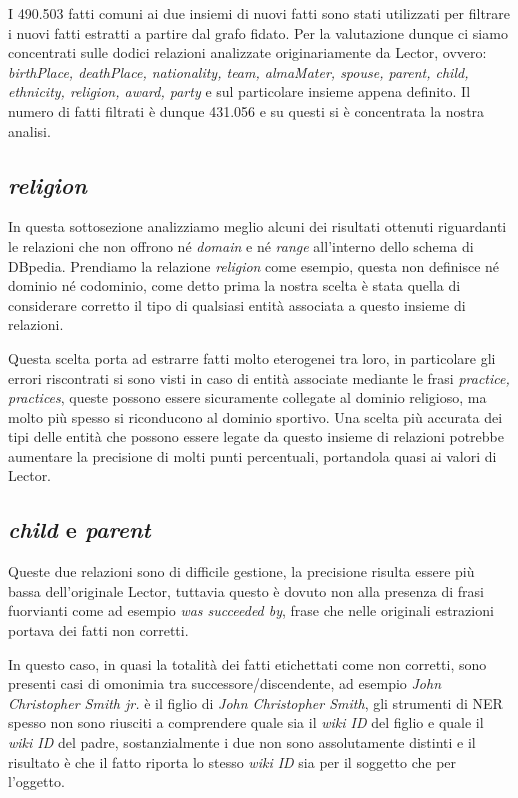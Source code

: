 \documentclass[10pt,a4paper,twocolumn]{article}
\begin{document}
I 490.503 fatti comuni ai due insiemi di nuovi fatti sono stati utilizzati per filtrare i nuovi fatti estratti a partire dal grafo fidato. Per la valutazione dunque ci siamo concentrati sulle dodici relazioni analizzate originariamente da Lector, ovvero:
\textit{birthPlace, deathPlace, nationality, team, almaMater, spouse, parent, child, ethnicity, religion, award, party} e sul particolare insieme appena definito. Il numero di fatti filtrati è dunque 431.056 e su questi si è concentrata la nostra analisi.

\subsection{\textit{religion}}

In questa sottosezione analizziamo meglio alcuni dei risultati ottenuti riguardanti le relazioni che non offrono né \textit{domain} e né \textit{range} all'interno dello schema di DBpedia. Prendiamo la relazione \textit{religion} come esempio, questa non definisce né dominio né codominio, come detto prima la nostra scelta è stata quella di considerare corretto il tipo di qualsiasi entità associata a questo insieme di relazioni.

Questa scelta porta ad estrarre fatti molto eterogenei tra loro, in particolare gli errori riscontrati si sono visti in caso di entità associate mediante le frasi \textit{practice, practices}, queste possono essere sicuramente collegate al dominio religioso, ma molto più spesso si riconducono al dominio sportivo. Una scelta più accurata dei tipi delle entità che possono essere legate da questo insieme di relazioni potrebbe aumentare la precisione di molti punti percentuali, portandola quasi ai valori di Lector.

\subsection{\textit{child} e \textit{parent}}\label{child&parent}

Queste due relazioni sono di difficile gestione, la precisione risulta essere più bassa dell'originale Lector, tuttavia questo è dovuto non alla presenza di frasi fuorvianti come ad esempio \textit{was succeeded by}, frase che nelle originali estrazioni portava dei fatti non corretti. 

In questo caso, in quasi la totalità dei fatti etichettati come non corretti, sono presenti casi di omonimia tra successore/discendente, ad esempio \textit{John Christopher Smith jr.} è il figlio di \textit{John Christopher Smith}, gli strumenti di NER spesso non sono riusciti a comprendere quale sia il \textit{wiki ID} del figlio e quale il \textit{wiki ID} del padre, sostanzialmente i due non sono assolutamente distinti e il risultato è che il fatto riporta lo stesso \textit{wiki ID} sia per il soggetto che per l'oggetto.
\end{document}
